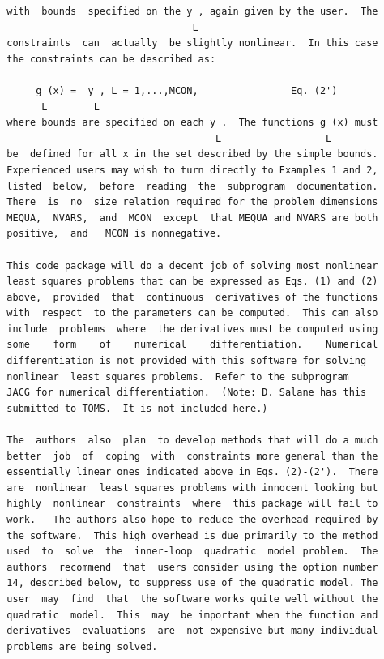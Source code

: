 \documentclass[11pt,twoside]{article}
\begin{document}
\begin{verbatim}
  with  bounds  specified on the y , again given by the user.  The
                                  L
  constraints  can  actually  be slightly nonlinear.  In this case
  the constraints can be described as:

       g (x) =  y , L = 1,...,MCON,                Eq. (2')
        L        L
  where bounds are specified on each y .  The functions g (x) must
                                      L                  L
  be  defined for all x in the set described by the simple bounds.
  Experienced users may wish to turn directly to Examples 1 and 2,
  listed  below,  before  reading  the  subprogram  documentation.
  There  is  no  size relation required for the problem dimensions
  MEQUA,  NVARS,  and  MCON  except  that MEQUA and NVARS are both
  positive,  and   MCON is nonnegative.

  This code package will do a decent job of solving most nonlinear
  least squares problems that can be expressed as Eqs. (1) and (2)
  above,  provided  that  continuous  derivatives of the functions
  with  respect  to the parameters can be computed.  This can also
  include  problems  where  the derivatives must be computed using
  some    form    of    numerical    differentiation.    Numerical
  differentiation is not provided with this software for solving
  nonlinear  least squares problems.  Refer to the subprogram
  JACG for numerical differentiation.  (Note: D. Salane has this
  submitted to TOMS.  It is not included here.)

  The  authors  also  plan  to develop methods that will do a much
  better  job  of  coping  with  constraints more general than the
  essentially linear ones indicated above in Eqs. (2)-(2').  There
  are  nonlinear  least squares problems with innocent looking but
  highly  nonlinear  constraints  where  this package will fail to
  work.   The authors also hope to reduce the overhead required by
  the software.  This high overhead is due primarily to the method
  used  to  solve  the  inner-loop  quadratic  model problem.  The
  authors  recommend  that  users consider using the option number
  14, described below, to suppress use of the quadratic model. The
  user  may  find  that  the software works quite well without the
  quadratic  model.  This  may  be important when the function and
  derivatives  evaluations  are  not expensive but many individual
  problems are being solved.


\end{verbatim}
\end{document}
